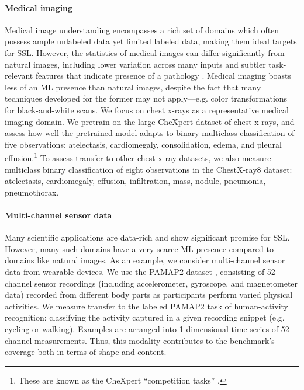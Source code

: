 \documentclass{article}
\begin{document}
\paragraph{Medical imaging} Medical image understanding encompasses a rich set of domains which often possess ample unlabeled data yet limited labeled data, making them ideal targets for SSL. However, the statistics of medical images can differ significantly from natural images, including lower variation across many inputs and subtler task-relevant features that indicate presence of a pathology \citep{Raghu2019TransfusionUT}. Medical imaging boasts less of an ML presence than natural images, despite the fact that many techniques developed for the former may not apply---e.g. color transformations for black-and-white scans. We focus on chest x-rays as a representative medical imaging domain. We pretrain on the large CheXpert \citep{Irvin2019CheXpertAL} dataset of chest x-rays, and assess how well the pretrained model adapts to binary multiclass classification of five observations: atelectasis, cardiomegaly, consolidation, edema, and pleural effusion.\footnote{These are known as the CheXpert ``competition tasks'' \citep{Irvin2019CheXpertAL}.} To assess transfer to other chest x-ray datasets, we also measure multiclass binary classification of eight observations in the ChestX-ray8 \citep{Wang2017ChestXRay8HC} dataset: atelectasis, cardiomegaly, effusion, infiltration, mass, nodule, pneumonia, pneumothorax.

\paragraph{Multi-channel sensor data} Many scientific applications are data-rich and show significant promise for SSL. However, many such domains have a very scarce ML presence compared to domains like natural images. As an example, we consider multi-channel sensor data from wearable devices. We use the PAMAP2 dataset \citep{Reiss2012IntroducingAN}, consisting of 52-channel sensor recordings (including accelerometer, gyroscope, and magnetometer data) recorded from different body parts as participants perform varied physical activities. We measure transfer to the labeled PAMAP2 task of human-activity recognition: classifying the activity captured in a given recording snippet (e.g. cycling or walking). Examples are arranged into 1-dimensional time series of 52-channel measurements. Thus, this modality contributes to the benchmark's coverage both in terms of shape and content.
\end{document}

